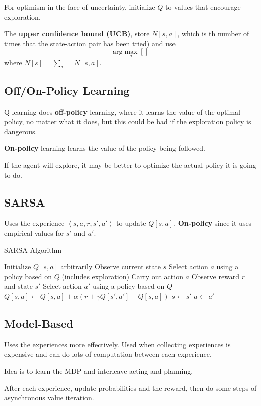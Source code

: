 \documentclass[11pt]{article}
\begin{document}
For optimism in the face of uncertainty, initialize \(Q\) to values that encourage exploration.

The \textbf{upper confidence bound (UCB)}, store \(N[s, a]\), which is th number of times that the
state-action pair has been tried) and use
$$ \text{arg} \max_{a} \left[ \right] $$
where \(N[s] = \sum_{a} = N[s, a]\).
\subsection{Off/On-Policy Learning}
\label{sec:orgeaea476}
Q-learning does \textbf{off-policy} learning, where it learns the value of the optimal policy, no matter
what it does, but this could be bad if the exploration policy is dangerous.

\textbf{On-policy} learning learns the value of the policy being followed.

If the agent will explore, it may be better to optimize the actual policy it is going to do.
\subsection{SARSA}
\label{sec:org3905e30}
Uses the experience \(\left< s, a, r, s', a' \right>\) to update \(Q[s, a]\).
\textbf{On-policy} since it uses empirical values for \(s'\) and \(a'\).

\begin{algorithm}
\caption{SARSA Algorithm}
\begin{algorithmic}[1]
\State Initialize $Q[s, a]$ arbitrarily
\State Observe current state $s$
\State Select action $a$ using a policy based on $Q$ (includes exploration)
\Repeat
    \State Carry out action $a$
    \State Observe reward $r$ and state $s'$
    \State Select action $a'$ using a policy based on $Q$
    \State $Q[s,a] \gets Q[s,a] + \alpha (r + \gamma Q[s',a'] - Q[s,a])$
    \State $s \gets s'$
    \State $a \gets a'$
\end{algorithmic}
\end{algorithm}
\subsection{Model-Based}
\label{sec:org7771393}
Uses the experiences more effectively.
Used when collecting experiences is expensive and can do lots of computation between
each experience.

Idea is to learn the MDP and interleave acting and planning.

After each experience, update probabilities and the reward, then do some steps of
asynchronous value iteration.
\end{document}

